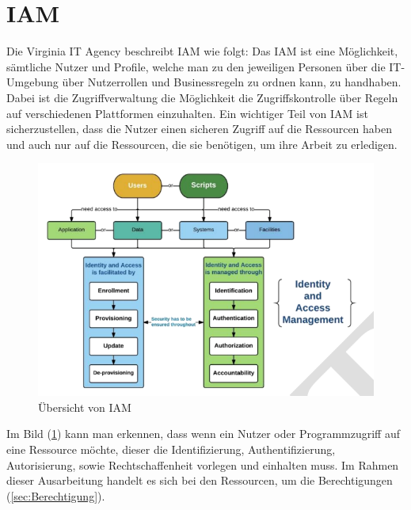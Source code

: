 \section{IAM}
\label{subsec:IAM}
Die Virginia IT Agency beschreibt IAM wie folgt: Das \ac{IAM} ist eine Möglichkeit, sämtliche Nutzer und Profile, welche man zu den jeweiligen Personen über die IT-Umgebung über Nutzerrollen und Businessregeln zu ordnen kann, zu handhaben. Dabei ist die Zugriffverwaltung die Möglichkeit die Zugriffskontrolle über Regeln auf verschiedenen Plattformen einzuhalten. Ein wichtiger Teil von \ac{IAM} ist sicherzustellen, dass die Nutzer einen sicheren Zugriff auf die Ressourcen haben und auch nur auf die Ressourcen, die sie benötigen, um ihre Arbeit zu erledigen. \cite{Virg07}
\begin{figure}[h!]
 \centering
 \includegraphics[width=1\textwidth]{gfx/Picture/IAM.PNG}
 \caption{Übersicht von IAM \cite{Moha19}}
 \label{fig:IAM}
\end{figure}
Im Bild (\ref{fig:IAM}) kann man erkennen, dass wenn ein Nutzer oder Programmzugriff auf eine Ressource möchte, dieser die Identifizierung, Authentifizierung, Autorisierung, sowie Rechtschaffenheit vorlegen und einhalten muss. \cite{Moha19}
\newline
Im Rahmen dieser Ausarbeitung handelt es sich bei den Ressourcen, um die Berechtigungen (\ref{sec:Berechtigung}).
